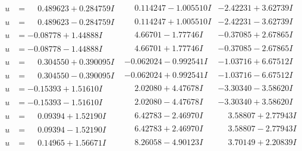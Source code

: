 \documentclass[1p]{elsarticle_modified}
\theoremstyle{definition}
\begin{document}
$$\begin{array}{c|c|c}
\begin{aligned}
u &= \phantom{-}0.489623 + 0.284759 I\end{aligned}
 & \phantom{-}0.114247 - 1.005510 I & -2.42231 + 3.62739 I \\ \hline\begin{aligned}
u &= \phantom{-}0.489623 - 0.284759 I\end{aligned}
 & \phantom{-}0.114247 + 1.005510 I & -2.42231 - 3.62739 I \\ \hline\begin{aligned}
u &= -0.08778 + 1.44888 I\end{aligned}
 & \phantom{-}4.66701 - 1.77746 I & -0.37085 + 2.67865 I \\ \hline\begin{aligned}
u &= -0.08778 - 1.44888 I\end{aligned}
 & \phantom{-}4.66701 + 1.77746 I & -0.37085 - 2.67865 I \\ \hline\begin{aligned}
u &= \phantom{-}0.304550 + 0.390095 I\end{aligned}
 & -0.062024 - 0.992541 I & -1.03716 + 6.67512 I \\ \hline\begin{aligned}
u &= \phantom{-}0.304550 - 0.390095 I\end{aligned}
 & -0.062024 + 0.992541 I & -1.03716 - 6.67512 I \\ \hline\begin{aligned}
u &= -0.15393 + 1.51610 I\end{aligned}
 & \phantom{-}2.02080 + 4.47678 I & -3.30340 - 3.58620 I \\ \hline\begin{aligned}
u &= -0.15393 - 1.51610 I\end{aligned}
 & \phantom{-}2.02080 - 4.47678 I & -3.30340 + 3.58620 I \\ \hline\begin{aligned}
u &= \phantom{-}0.09394 + 1.52190 I\end{aligned}
 & \phantom{-}6.42783 - 2.46970 I & \phantom{-}3.58807 + 2.77943 I \\ \hline\begin{aligned}
u &= \phantom{-}0.09394 - 1.52190 I\end{aligned}
 & \phantom{-}6.42783 + 2.46970 I & \phantom{-}3.58807 - 2.77943 I \\ \hline\begin{aligned}
u &= \phantom{-}0.14965 + 1.56671 I\end{aligned}
 & \phantom{-}8.26058 - 4.90123 I & \phantom{-}3.70149 + 2.20839 I \\ \hline\begin{aligned}

\end{aligned}
\end{array}$$
\end{document}

